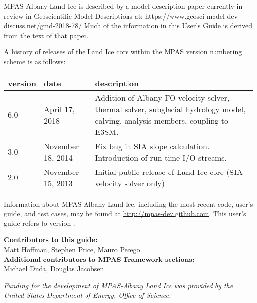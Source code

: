 MPAS-Albany Land Ice is described by a model description paper currently in review in Geoscientific Model Descriptions at:
https://www.geosci-model-dev-discuss.net/gmd-2018-78/
Much of the information in this User's Guide is derived from the text of that paper.


A history of releases of the Land Ice core within the MPAS version numbering scheme is as follows:

\begin{tabular}{p{1.5cm} p{3.7cm} p{10cm}} 
\hline\hline version & date & description  \\
\hline 
6.0 & April 17, 2018 & Addition of Albany FO velocity solver, thermal solver, subglacial hydrology model, calving, analysis members, coupling to E3SM.\\
\hline 
3.0 & November 18, 2014 & Fix bug in SIA slope calculation.  Introduction of run-time I/O streams. \\
\hline 
2.0 & November 15, 2013 & Initial public release of Land Ice core (SIA velocity solver only) \\
\hline 
\end{tabular} 

Information about MPAS-Albany Land Ice, including the most recent code, user's guide, and test cases, may be found at \url{http://mpas-dev.github.com}.  This user's guide refers to version \version.

\vspace{8pt}
\noindent
{\bf Contributors to this guide:}\\
Matt Hoffman, Stephen Price, Mauro Perego\\
{\bf Additional contributors to MPAS Framework sections:}\\
Michael Duda, Douglas Jacobsen

\vspace{8pt}
\noindent
{\it Funding for the development of MPAS-Albany Land Ice was provided by the United States Department of Energy, Office of Science.}




